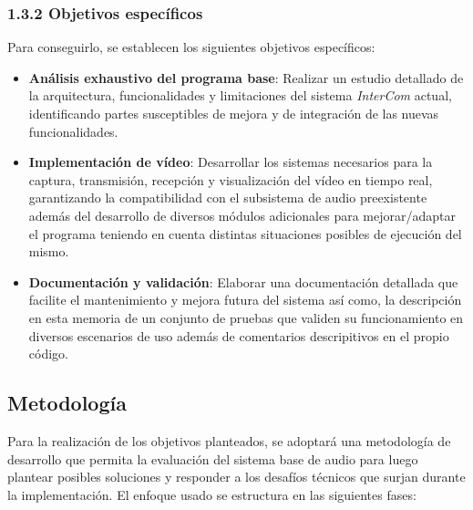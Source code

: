 \subsubsection*{1.3.2 Objetivos específicos}

Para conseguirlo, se establecen los siguientes objetivos específicos:

\begin{itemize}
    \item \textbf{Análisis exhaustivo del programa base}: Realizar un estudio detallado de la arquitectura, funcionalidades y limitaciones del sistema \textit{InterCom} actual, identificando partes susceptibles de mejora y de integración de las nuevas funcionalidades.
    
    \item \textbf{Implementación de vídeo}: Desarrollar los sistemas necesarios para la captura, transmisión, recepción y visualización del vídeo en tiempo real, garantizando la compatibilidad con el subsistema de audio preexistente además del desarrollo de diversos módulos adicionales para mejorar/adaptar el programa teniendo en cuenta distintas situaciones posibles de ejecución del mismo.
    
    \item \textbf{Documentación y validación}: Elaborar una documentación detallada que facilite el mantenimiento y mejora futura del sistema así como, la descripción en esta memoria de un conjunto de pruebas que validen su funcionamiento en diversos escenarios de uso además de comentarios descripitivos en el propio código.
\end{itemize}

\subsection{Metodología}

Para la realización de los objetivos planteados, se adoptará una metodología de desarrollo que permita la evaluación del sistema base de audio para luego plantear posibles soluciones y responder a los desafíos técnicos que surjan durante la implementación. El enfoque usado se estructura en las siguientes fases:

